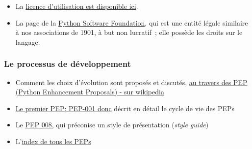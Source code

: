     \begin{itemize}
\tightlist
\item
  La \href{https://docs.python.org/3/license.html}{licence d'utilisation
  est disponible ici}.
\item
  La page de la \href{https://www.python.org/psf/}{Python Software
  Foundation}, qui est une entité légale similaire à nos associations de
  1901, à but non lucratif~; elle possède les droits sur le langage.
\end{itemize}

    \hypertarget{le-processus-de-duxe9veloppement}{%
\subsubsection{Le processus de
développement}\label{le-processus-de-duxe9veloppement}}

    \begin{itemize}
\tightlist
\item
  Comment les choix d'évolution sont proposés et discutés,
  \href{http://en.wikipedia.org/wiki/Python_\%28programming_language\%29\#Development}{au
  travers des PEP (Python Enhancement Proposals) - sur wikipedia}
\item
  \href{http://legacy.python.org/dev/peps/pep-0001/}{Le premier PEP:
  PEP-001 donc} décrit en détail le cycle de vie des PEPs
\item
  Le \href{http://legacy.python.org/dev/peps/pep-0008}{PEP 008}, qui
  préconise un style de présentation (\emph{style guide})
\item
  L'\href{http://legacy.python.org/dev/peps/}{index de tous les PEPs}
\end{itemize}


    
    
    
